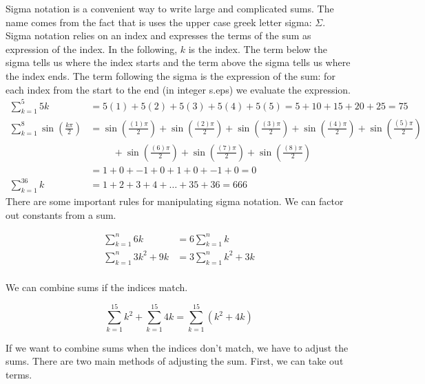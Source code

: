 \documentclass[fleqn]{report}
\begin{document}
Sigma notation is a convenient way to write large and
complicated sums. The name comes from the fact that is uses
the upper case greek letter sigma: $\Sigma$. Sigma notation
relies on an index and expresses the terms of the sum as
expression of the index. In the following, $k$ is the index.
The term below the sigma tells us where the index starts and
the term above the sigma tells us where the index ends. The
term following the sigma is the expression of the sum: for
each index from the start to the end (in integer s.eps) we
evaluate the expression.
\begin{align*}
\sum_{k=1}^5 5k & = 5(1) + 5(2) + 5(3) + 5(4) + 5(5) =
5+10+15+20+25 = 75 \\
\sum_{k=1}^8 \sin \left(\frac{k\pi}{2} \right) & = 
\sin \left( \frac{(1)\pi}{2} \right) + 
\sin \left( \frac{(2)\pi}{2} \right) + 
\sin \left( \frac{(3)\pi}{2} \right) + 
\sin \left( \frac{(4)\pi}{2} \right) + 
\sin \left( \frac{(5)\pi}{2} \right) \\
& \hspace{1cm} + \sin \left( \frac{(6)\pi}{2} \right) + 
\sin \left( \frac{(7)\pi}{2} \right) + 
\sin \left( \frac{(8)\pi}{2} \right) \\
& = 1 + 0 + -1 + 0 + 1 + 0 + -1 + 0 = 0 \\
\sum_{k=1}^{36} k & = 1 + 2 + 3 + 4 + \ldots + 35 + 36 = 666
\end{align*}
There are some important rules for manipulating sigma
notation. We can factor out constants from a sum.

\begin{example}
\begin{align*}
\sum_{k=1}^n 6k & = 6 \sum_{k=1}^n k \\
\sum_{k=1}^n 3k^2 + 9k & = 3 \sum_{k=1}^n k^2 + 3k\\
\end{align*}
\end{example}

We can combine sums if the indices match.

\begin{example}
\begin{equation*}
\sum_{k=1}^{15} k^2 + \sum_{k=1}^{15} 4k = \sum_{k=1}^{15}
(k^2 + 4k)
\end{equation*}
\end{example}

If we want to combine sums when the indices don't match, we
have to adjust the sums. There are two main methods of
adjusting the sum. First, we can take out terms. 
\end{document}
